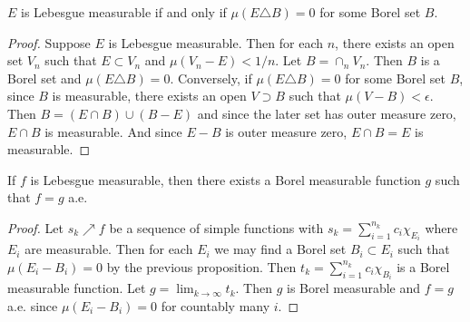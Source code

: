 \begin{proposition}
    $E$ is Lebesgue measurable if and only if $\mu(E\triangle B)=0$ for some 
    Borel set $B$.
\end{proposition}
\begin{proof}
    Suppose $E$ is Lebesgue measurable. Then for each $n$, there exists
    an open set $V_n$ such that $E\subset V_n$ and $\mu(V_n-E)<1/n$. 
    Let $B = \cap_n V_n$. Then $B$ is a Borel set and $\mu(E\triangle B) = 0$. 
    Conversely, if $\mu(E\triangle B) = 0$ for some Borel set $B$, 
    since $B$ is measurable, there exists an open $V\supset B$ such that 
    $\mu(V-B)<\epsilon$. Then $B = (E\cap B) \cup (B-E)$ and since the 
    later set has outer measure zero, $E\cap B$ is measurable. And since 
    $E-B$ is outer measure zero, $E\cap B = E$ is measurable.
\end{proof}

\begin{proposition}
    If $f$ is Lebesgue measurable, then there exists a Borel measurable 
    function $g$ such that $f=g$ a.e.
\end{proposition}
\begin{proof}
    Let $s_k\nearrow f$ be a sequence of simple functions with 
    $s_k = \sum_{i=1}^{n_k}c_i\chi_{E_i}$ where $E_i$ are measurable. 
    Then for each $E_i$ we may find a Borel set $B_i\subset E_i$ 
    such that $\mu(E_i-B_i) = 0$ by the previous proposition. 
    Then $t_k = \sum_{i=1}^{n_k}c_i\chi_{B_i}$ is a Borel measurable 
    function. Let $g = \lim_{k\to\infty} t_k$. Then $g$ is Borel measurable 
    and $f=g$ a.e. since $\mu(E_i-B_i)=0$ for countably many $i$.
\end{proof}